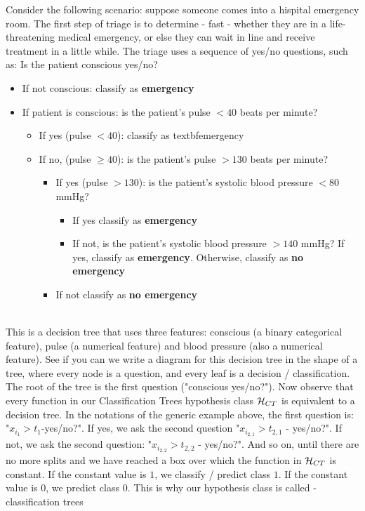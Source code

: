 \begin{example}
	Consider the following scenario: suppose someone comes into a hispital emergency room. The first step of triage is to determine - fast - whether they are in a life-threatening medical emergency, or else they can wait in line and receive treatment in a little while. The triage uses a sequence of yes/no questions, such as: Is the patient conscious yes/no?
	\begin{itemize}
		\item If not conscious: classify as \textbf{emergency}
		\item If patient is conscious: is the patient's pulse $<40$ beats per minute?
		\begin{itemize}
			\item If yes (pulse $<40$): classify as textbf{emergency}
			\item If no, (pulse $\geq 40$): is the patient's pulse $>130$ beats per minute?
			\begin{itemize}
				\item If yes (pulse $>130$): is the patient's systolic blood pressure $<80$ mmHg?
				\begin{itemize} %
					\item If yes classify as \textbf{emergency}
					\item If not, is the patient's systolic blood pressure $>140$ mmHg? If yes, classify as \textbf{emergency}. Otherwise, classify as \textbf{no emergency}
				\end{itemize}
				\item If not classify as \textbf{no emergency}
			\end{itemize}
		\end{itemize}
	\end{itemize}
	
	~\\This is a decision tree that uses three features: conscious (a binary categorical feature), pulse (a numerical feature) and blood pressure (also a numerical feature). See if you can we write a diagram for this decision tree in the shape of a tree, where every node is a question, and every leaf is a decision / classification. The root of the tree is the first question ("conscious yes/no?").
	Now observe that every function in our Classification Trees hypothesis class $\mathcal{H}_{CT}$ is equivalent to a decision tree. In the notations of the generic example above, the first question is: "$x_{i_1}>t_1$-yes/no?".  If yes, we ask the second question "$x_{i_{2,1}}>t_{2,1}$ - yes/no?". If not, we ask the second question: "$x_{i_{2,2}}>t_{2,2}$ - yes/no?". And so on, until there are no more splits and we have reached a box over which the function in $\mathcal{H}_{CT}$ is constant. If the constant value is $1$, we classify / predict class $1$. If the constant value is $0$, we predict class $0$. This is why our hypothesis class is called - classification trees
\end{example}

